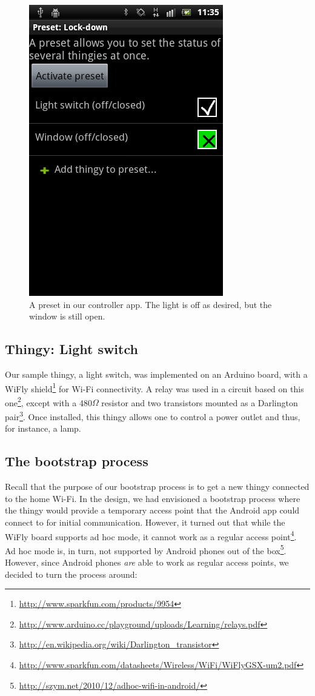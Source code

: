 \documentclass{ubicomp2012}
\begin{document}
\begin{figure}[th]
\begin{center}
\includegraphics[width=0.45\columnwidth]{figures/home-remote-preset.png}
\end{center}
\caption{A preset in our controller app. The light is off as desired, but the window is still open.}
\label{fig:homeRemotePresets}
\end{figure}

\subsection{Thingy: Light switch}

Our sample thingy, a light switch, was implemented on an Arduino board, with a WiFly shield\footnote{\url{http://www.sparkfun.com/products/9954}} for Wi-Fi connectivity. A relay was used in a circuit based on this one\footnote{\url{http://www.arduino.cc/playground/uploads/Learning/relays.pdf}}, except with a 480$\Omega$ resistor and two transistors mounted as a Darlington pair\footnote{\url{http://en.wikipedia.org/wiki/Darlington_transistor}}. Once installed, this thingy allows one to control a power outlet and thus, for instance, a lamp.
\subsection{The bootstrap process}

Recall that the purpose of our bootstrap process is to get a new thingy connected to the home Wi-Fi. In the design, we had envisioned a bootstrap process where the thingy would provide a temporary access point that the Android app could connect to for initial communication. However, it turned out that while the WiFly board supports ad hoc mode, it cannot work as a regular access point\footnote{\url{http://www.sparkfun.com/datasheets/Wireless/WiFi/WiFlyGSX-um2.pdf}}. Ad hoc mode is, in turn, not supported by Android phones out of the box\footnote{\url{http://szym.net/2010/12/adhoc-wifi-in-android/}}. However, since Android phones \emph{are} able to work as regular access points, we decided to turn the process around:
\end{document}
